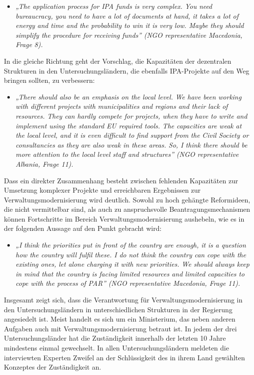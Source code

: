 \begin{itemize}[label={}]
\item \textit{„The application process for IPA funds is very complex. You need bureaucracy, you need to have a lot of documents at hand, it takes a lot of energy and time and the probability to win it is very low. Maybe they should simplify the procedure for receiving funds” (NGO representative Macedonia, Frage 8).}
\end{itemize}
In die gleiche Richtung geht der Vorschlag, die Kapazitäten der dezentralen Strukturen in den Untersuchungsländern, die ebenfalls IPA-Projekte auf den Weg bringen sollten, zu verbessern:
\begin{itemize}[label={}]
\item \textit{„There should also be an emphasis on the local level. We have been working with different projects with municipalities and regions and their lack of resources. They can hardly compete for projects, when they have to write and implement using the standard EU required tools. The capacities are weak at the local level, and it is even difficult to find support from the Civil Society or consultancies as they are also weak in these areas. So, I think there should be more attention to the local level staff and structures” (NGO representative Albania, Frage 11).}
\end{itemize}
Dass ein direkter Zusammenhang besteht zwischen fehlenden Kapazitäten zur Umsetzung komplexer Projekte und erreichbaren Ergebnissen zur Verwaltungsmodernisierung wird deutlich. Sowohl zu hoch gehängte Reformideen, die nicht vermittelbar sind, als auch zu anspruchsvolle Beantragungsmechanismen können Fortschritte im Bereich Verwaltungsmodernisierung aushebeln, wie es in der folgenden Aussage auf den Punkt gebracht wird:
\begin{itemize}[label={}]
\item \textit{„I think the priorities put in front of the country are enough, it is a question how the country will fulfil these. I do not think the country can cope with the existing ones, let alone charging it with new priorities. We should always keep in mind that the country is facing limited resources and limited capacities to cope with the process of PAR” (NGO representative Macedonia, Frage 11).}
\end{itemize}
Insgesamt zeigt sich, dass die Verantwortung für Verwaltungsmodernisierung in den Untersuchungsländern in unterschiedlichen Strukturen in der Regierung angesiedelt ist. Meist handelt es sich um ein Ministerium, das neben anderen Aufgaben auch mit Verwaltungsmodernisierung betraut ist. In jedem der drei Untersuchungsländer hat die Zuständigkeit innerhalb der letzten 10 Jahre mindestens einmal gewechselt. In allen Untersuchungsländern meldeten die interviewten Experten Zweifel an der Schlüssigkeit des in ihrem Land gewählten Konzeptes der Zuständigkeit an. 
